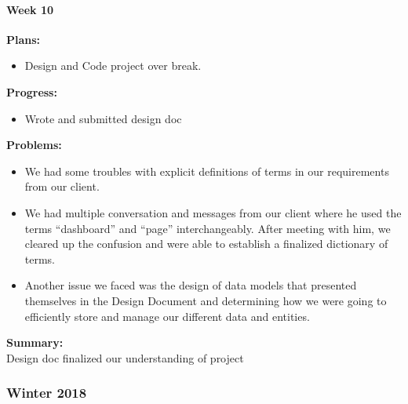 \paragraph{Week 10}
\begin{adjustwidth}{2.5em}{0pt}
    \vspace{-0.5cm}\textbf{Plans:}
    \vspace{-0.5cm}
    \begin{itemize}
        \item Design and Code project over break. 
    \end{itemize} 
    \vspace{-0.3cm}\textbf{Progress:}
    \vspace{-0.5cm}
    \begin{itemize}
        \item  Wrote and submitted design doc 
    \end{itemize} 
    \vspace{-0.3cm}\textbf{Problems:}\\
	\vspace{-0.5cm}
	\begin{itemize}
		\item We had some troubles with explicit definitions of terms in our requirements from our client. 
		\item We had multiple conversation and messages from our client where he used the terms ``dashboard'' and ``page'' interchangeably. After meeting with him, we cleared up the confusion and were able to establish a finalized dictionary of terms. 
		\item Another issue we faced was the design of data models that presented themselves in the Design Document and determining how we were going to efficiently store and manage our different data and entities. 
	\end{itemize} 
	\vspace{-0.3cm}\noindent\textbf{Summary:}\\
    \noindent Design doc finalized our understanding of project 
\end{adjustwidth} 
\subsubsection{Winter 2018}
